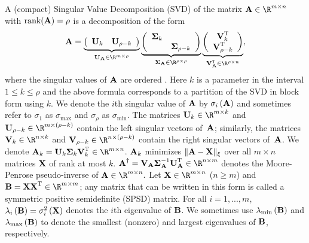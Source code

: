 A (compact) Singular Value Decomposition (SVD) of the matrix $\matA \in \R^{m \times n}$ with $\hbox{\rm rank}({\bm{\mathrm{A}}}) = \rho$ is a decomposition of the form
\begin{eqnarray*}
\label{svdA} \matA
         = \underbrace{\left(\begin{array}{cc}
             \matU_{k} & \matU_{\rho-k}
          \end{array}
    \right)}_{\matU_{\matA} \in \R^{m \times \rho}}
    \underbrace{\left(\begin{array}{cc}
             \matSig_{k} & \\
              & \matSig_{\rho - k}
          \end{array}
    \right)}_{\matSig_\matA \in \R^{\rho \times \rho}}
    \underbrace{\left(\begin{array}{c}
             \matV_{k}\transp\\
             \matV_{\rho-k}\transp
          \end{array}
    \right)}_{\matV_\matA\transp \in \R^{\rho \times n}},
\end{eqnarray*}
where the singular values of ${\bm{\mathrm{A}}}$ are ordered .
Here $k$ is a parameter in the interval $1 \le k \le \rho$ and the above formula corresponds to a partition of the SVD in block form using $k$.
We denote the $i$th singular value of ${\bm{\mathrm{A}}}$ by $\sigma_i\left({\bm{\mathrm{A}}}\right)$ and sometimes refer to $\sigma_1$ as $\sigma_{\max}$ and $\sigma_\rho$ as $\sigma_{\min}$. The matrices $\matU_k \in \R^{m \times k}$ and $\matU_{\rho-k} \in \R^{m \times (\rho-k)}$ contain the left singular vectors of~${\bm{\mathrm{A}}}$; similarly, the matrices $\matV_k \in \R^{n \times k}$ and $\matV_{\rho-k} \in \R^{n \times (\rho-k)}$ contain the right singular vectors of~${\bm{\mathrm{A}}}$. We denote $\matA_k = \matU_k \matSig_{k} \matV_k\transp \in \R^{m \times n}$. ${\bm{\mathrm{A}}}_k$ minimizes $\mbox{}\|{\bm{\mathrm{A}}} - {\bm{\mathrm{X}}}\|_{\xi}$ over all $m \times n$ matrices ${\bm{\mathrm{X}}}$ of rank at most $k$.
$\pinv{\matA} = \matV_\matA \matSig_\matA^{-1} \matU_\matA\transp \in \R^{n \times m}$ denotes the Moore-Penrose pseudo-inverse of $\matA \in \R^{m \times n}.$
Let $\matX \in \R^{m \times n}$ ($n \ge m$) and $\matB=\matX \matX\transp \in \R^{m \times m}$; any matrix that can be written in this form is called a symmetric positive semidefinite (SPSD) matrix. For all $i=1, ...,m$, $\lambda_{i}\left({\bm{\mathrm{B}}}\right) = \sigma_{i}^2\left({\bm{\mathrm{X}}}\right)$ denotes the $i$th eigenvalue of ${\bm{\mathrm{B}}}$. We sometimes use $\lambda_{\min}\left({\bm{\mathrm{B}}}\right)$ and $\lambda_{\max}\left({\bm{\mathrm{B}}}\right)$ to denote the smallest (nonzero) and largest eigenvalues of ${\bm{\mathrm{B}}}$, respectively.


